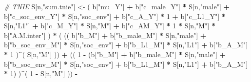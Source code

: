 \documentclass[
]{book}
\newenvironment{Shaded}{\begin{snugshade}}{\end{snugshade}}
\newcommand{\CommentTok}[1]{\textcolor[rgb]{0.56,0.35,0.01}{\textit{#1}}}
\newcommand{\DecValTok}[1]{\textcolor[rgb]{0.00,0.00,0.81}{#1}}
\newcommand{\NormalTok}[1]{#1}
\newcommand{\OtherTok}[1]{\textcolor[rgb]{0.56,0.35,0.01}{#1}}
\newcommand{\SpecialCharTok}[1]{\textcolor[rgb]{0.81,0.36,0.00}{\textbf{#1}}}
\newcommand{\StringTok}[1]{\textcolor[rgb]{0.31,0.60,0.02}{#1}}
\begin{document}
\begin{Shaded}
\begin{Highlighting}[]
    \CommentTok{\# TNIE }
\NormalTok{    S[n,}\StringTok{"sum.tnie"}\NormalTok{] }\OtherTok{\textless{}{-}}\NormalTok{ ( b[}\StringTok{"mu\_Y"}\NormalTok{] }\SpecialCharTok{+} 
\NormalTok{                           b[}\StringTok{"c\_male\_Y"}\NormalTok{] }\SpecialCharTok{*}\NormalTok{ S[n,}\StringTok{"male"}\NormalTok{] }\SpecialCharTok{+} 
\NormalTok{                           b[}\StringTok{"c\_soc\_env\_Y"}\NormalTok{] }\SpecialCharTok{*}\NormalTok{ S[n,}\StringTok{"soc\_env"}\NormalTok{] }\SpecialCharTok{+} 
\NormalTok{                           b[}\StringTok{"c\_A\_Y"}\NormalTok{] }\SpecialCharTok{*} \DecValTok{1} \SpecialCharTok{+} 
\NormalTok{                           b[}\StringTok{"c\_L1\_Y"}\NormalTok{] }\SpecialCharTok{*}\NormalTok{ S[n,}\StringTok{"L1"}\NormalTok{] }\SpecialCharTok{+}
\NormalTok{                           b[}\StringTok{"c\_M\_Y"}\NormalTok{] }\SpecialCharTok{*}\NormalTok{ S[n,}\StringTok{"M"}\NormalTok{] }\SpecialCharTok{+}
\NormalTok{                           b[}\StringTok{"c\_AM\_Y"}\NormalTok{] }\SpecialCharTok{*} \DecValTok{1} \SpecialCharTok{*}\NormalTok{ S[n,}\StringTok{"M"}\NormalTok{] }\SpecialCharTok{*}\NormalTok{ b[}\StringTok{"A.M.inter"}\NormalTok{] ) }\SpecialCharTok{*}
\NormalTok{      ( (( b[}\StringTok{"b\_M"}\NormalTok{] }\SpecialCharTok{+} 
\NormalTok{             b[}\StringTok{"b\_male\_M"}\NormalTok{] }\SpecialCharTok{*}\NormalTok{ S[n,}\StringTok{"male"}\NormalTok{] }\SpecialCharTok{+} 
\NormalTok{             b[}\StringTok{"b\_soc\_env\_M"}\NormalTok{] }\SpecialCharTok{*}\NormalTok{ S[n,}\StringTok{"soc\_env"}\NormalTok{] }\SpecialCharTok{+} 
\NormalTok{             b[}\StringTok{"b\_L1\_M"}\NormalTok{] }\SpecialCharTok{*}\NormalTok{ S[n,}\StringTok{"L1"}\NormalTok{] }\SpecialCharTok{+}
\NormalTok{             b[}\StringTok{"b\_A\_M"}\NormalTok{] }\SpecialCharTok{*} \DecValTok{1}\NormalTok{ )}\SpecialCharTok{\^{}}\NormalTok{( S[n,}\StringTok{"M"}\NormalTok{] )) }\SpecialCharTok{+}
\NormalTok{          (( }\DecValTok{1} \SpecialCharTok{{-}}\NormalTok{ (b[}\StringTok{"b\_M"}\NormalTok{] }\SpecialCharTok{+} 
\NormalTok{                    b[}\StringTok{"b\_male\_M"}\NormalTok{] }\SpecialCharTok{*}\NormalTok{ S[n,}\StringTok{"male"}\NormalTok{] }\SpecialCharTok{+} 
\NormalTok{                    b[}\StringTok{"b\_soc\_env\_M"}\NormalTok{] }\SpecialCharTok{*}\NormalTok{ S[n,}\StringTok{"soc\_env"}\NormalTok{] }\SpecialCharTok{+} 
\NormalTok{                    b[}\StringTok{"b\_L1\_M"}\NormalTok{] }\SpecialCharTok{*}\NormalTok{ S[n,}\StringTok{"L1"}\NormalTok{] }\SpecialCharTok{+}
\NormalTok{                    b[}\StringTok{"b\_A\_M"}\NormalTok{] }\SpecialCharTok{*} \DecValTok{1}\NormalTok{) )}\SpecialCharTok{\^{}}\NormalTok{( }\DecValTok{1} \SpecialCharTok{{-}}\NormalTok{ S[n,}\StringTok{"M"}\NormalTok{] )) }\SpecialCharTok{{-}}

\end{Highlighting}
\end{Shaded}
\end{document}
